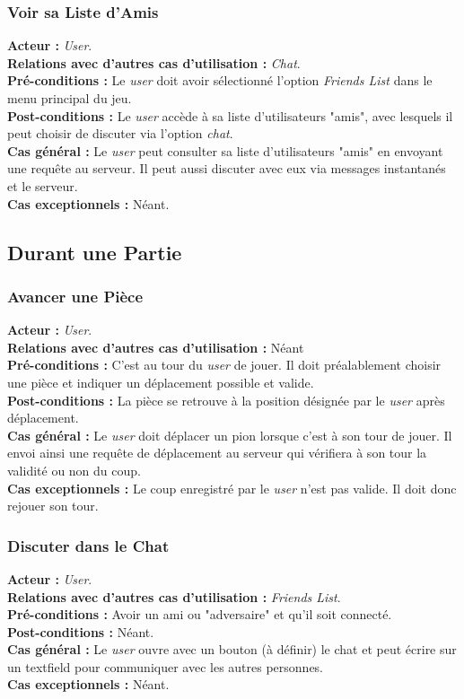 \documentclass[10pt, a4paper]{article}
\begin{document}
\subsubsection{Voir sa Liste d'Amis}
\textbf{Acteur :} \textit{User}.\\
\textbf{Relations avec d'autres cas d'utilisation :} \textit{Chat}.\\
\textbf{Pré-conditions :} Le \textit{user} doit avoir sélectionné l'option \textit{Friends List} dans le menu principal du jeu.\\
\textbf{Post-conditions :} Le \textit{user} accède à sa liste d'utilisateurs "amis", avec lesquels il peut choisir de discuter via l'option \textit{chat}.\\
\textbf{Cas général :} Le \textit{user} peut consulter sa liste d'utilisateurs "amis" en envoyant une requête au serveur. Il peut aussi discuter avec eux via messages instantanés et le serveur.\\
\textbf{Cas exceptionnels :} Néant.


\subsection{Durant une Partie}

\subsubsection{Avancer une Pièce}
\textbf{Acteur :} \textit{User}.\\
\textbf{Relations avec d'autres cas d'utilisation :} Néant \\
\textbf{Pré-conditions :} C'est au tour du \textit{user} de jouer. Il doit préalablement choisir une pièce et indiquer un déplacement possible et valide. \\
\textbf{Post-conditions :} La pièce se retrouve à la position désignée par le \textit{user} après déplacement. \\
\textbf{Cas général :} Le \textit{user} doit déplacer un pion lorsque c'est à son tour de jouer. Il envoi ainsi une requête de déplacement au serveur qui vérifiera à son tour la validité ou non du coup. \\
\textbf{Cas exceptionnels :} Le coup enregistré par le \textit{user} n'est pas valide. Il doit donc rejouer son tour. \\

\subsubsection{Discuter dans le Chat}
\textbf{Acteur :} \textit{User}.\\
\textbf{Relations avec d'autres cas d'utilisation :} \textit{Friends List}.\\
\textbf{Pré-conditions :} Avoir un ami ou "adversaire" et qu'il soit connecté.\\
\textbf{Post-conditions :} Néant.\\
\textbf{Cas général :} Le \textit{user} ouvre avec un bouton (à définir) le chat et peut écrire sur un textfield pour communiquer avec les autres personnes.\\ %
\textbf{Cas exceptionnels :} Néant.
\end{document}
